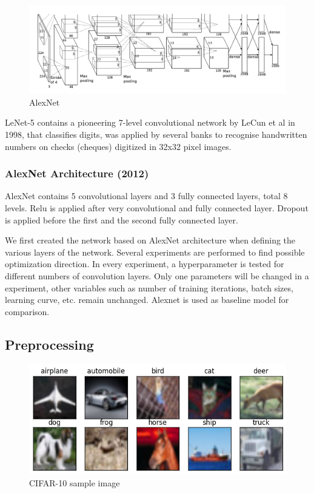 \documentclass[journal,onecolumn, 12pt]{IEEEtran}
\begin{document}
\begin{figure}[!t]
\includegraphics[width=0.8\paperwidth]{images/alexnet}
\caption{AlexNet}
\end{figure}

LeNet-5 contains a pioneering 7-level convolutional network by LeCun et al in 1998, that classifies digits, was applied by several banks to recognise handwritten numbers on checks (cheques) digitized in 32x32 pixel images.

\subsubsection{AlexNet Architecture (2012)}
AlexNet contains 5 convolutional layers and 3 fully connected layers, total 8 levels. Relu is applied after very convolutional and fully connected layer. Dropout is applied before the first and the second fully connected layer. 

We first created the network based on AlexNet architecture when defining the various layers of the network. Several experiments are performed to find possible optimization direction. In every experiment, a hyperparameter is tested for different numbers of convolution layers. Only one parameters will be changed in a experiment, other variables such as number of training iterations, batch sizes, learning curve, etc. remain unchanged. Alexnet is used as baseline model for comparison.

\subsection{Preprocessing}

\begin{figure}[!t]
\includegraphics[width=0.6\paperwidth]{images/class}
\caption{CIFAR-10 sample image}
\end{figure}
\end{document}
